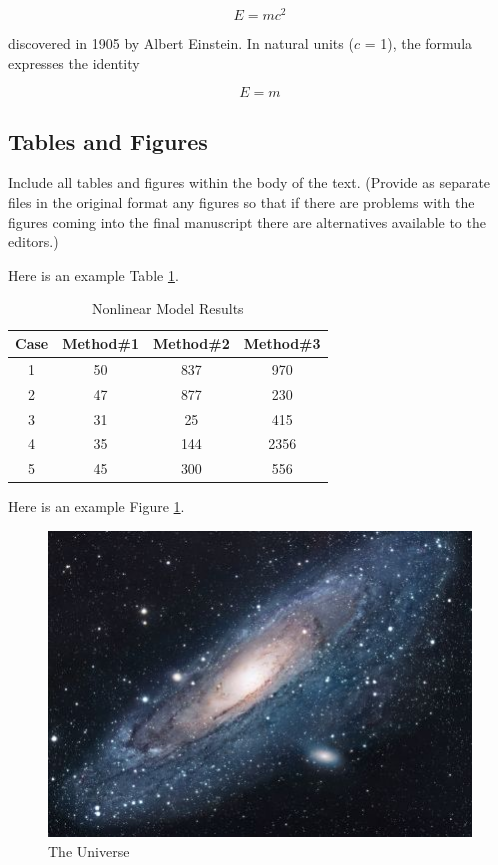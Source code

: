 \documentclass{article}
\begin{document}
$$E=mc^2$$

discovered in 1905 by Albert Einstein.
In natural units ($c$ = 1), the formula expresses the identity

\begin{equation}
E=m
\end{equation}

\subsection{Tables and Figures}
Include all tables and figures within the body of the text. (Provide as separate files in the original format any figures so that if there are problems with the figures coming into the final manuscript there are alternatives available to the editors.)

Here is an example Table \ref{table:nonlin}.

\begin{table}[ht]
\caption{Nonlinear Model Results} %
\label{table:nonlin} %
\centering %
\begin{tabular}{c c c c} %
\hline\hline %
Case & Method\#1 & Method\#2 & Method\#3 \\ [0.5ex] %
\hline %
1 & 50 & 837 & 970 \\ %
2 & 47 & 877 & 230 \\
3 & 31 & 25 & 415 \\
4 & 35 & 144 & 2356 \\
5 & 45 & 300 & 556 \\ [1ex] %
\hline %
\end{tabular}
\end{table}

Here is an example Figure \ref{figure:universe}.

\begin{figure}[h!]
\centering
\includegraphics[scale=1.7]{universe}
\caption{The Universe}
\label{figure:universe}
\end{figure}
\end{document}
